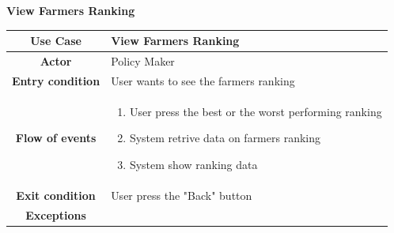 \documentclass[table, 12pt]{article}
\begin{document}
\begin{itemize}
           
            \begin{table}[H]
                \item[] \textbf{View Farmers Ranking}
                \item[] 
                \centering
                \begin{tabular}{c m{}}
                    \hline
                    \textbf{Use Case} & View Farmers Ranking\\ \hline
                    \textbf{Actor} & Policy Maker\\ \hline
                    \textbf{Entry condition} & User wants to see the farmers ranking\\  \hline
                    \textbf{Flow of events} & \begin{enumerate}
                                                \item User press the best or the worst performing ranking
                                                \item System retrive data on farmers ranking
                                                \item System show ranking data 
                                            \end{enumerate}\\ \hline
                    \textbf{Exit condition} & User press the "Back" button\\ \hline
                    \textbf{Exceptions} &  \\ \hline                    
                \end{tabular}
            \end{table}


\end{itemize}
\end{document}
